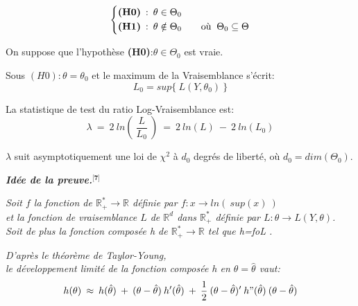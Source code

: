 \documentclass[11pt,fleqn]{book} %
\begin{document}
\vspace{1em}

\begin{equation*}
\left\{\begin{aligned} & \textbf{(H0)} \: : \: \theta\in\Theta_0 \\
 & \textbf{(H1)} \: : \: \theta \notin \Theta_0 
 \qquad \textnormal{où }\: \Theta_0 \subseteq \Theta \end{aligned}\right. 
\end{equation*}

\vspace{2em} 

On suppose que l'hypothèse \textbf{(H0)}\::\:$\theta\in\Theta_0$ est vraie.

\vspace{1em}

Sous $(H0): \theta=\theta_0$ et le maximum de la Vraisemblance s'écrit:
\[
L_0=sup\{\:L(Y,\theta_0)\:\} 
\]

\vspace{2em}

La statistique de test du ratio Log-Vraisemblance est:
\[
\lambda\:=\:2\:ln\left(\:
\frac{L}{L_0}
\:\right) \:=\: 2\:ln(L)\:-\: 2\:ln(L_0)
\]

\vspace{1em}

$\lambda$ suit asymptotiquement une loi de $\chi^2$ à $d_0$ degrés de liberté, où $d_0=dim(\Theta_0)$.

\vspace{0.5em}

\textbf{\textit{Idée de la preuve.$^\textbf{[7]}$}}

\vspace{0.5em}

\textit{
Soit $f$ la fonction de $\mathbb{R}_{+}^{*}\rightarrow\mathbb{R}$ définie par $f:x\rightarrow ln(\:sup(x)\:)$\\ et la fonction de vraisemblance $L$ de $\mathbb{R}^{d}$ dans $\mathbb{R}_{+}^{*}$ définie par $L:\theta \rightarrow L(Y,\theta)$.\\ 
Soit de plus la fonction composée h de $\mathbb{R}_{+}^{*}\rightarrow\mathbb{R}$ tel que h\:=\:f\:o\:L .}

\vspace{1em}

\textit{D'après le théorème de Taylor-Young,\\ 
le développement limité de la fonction composée h en $\theta=\hat{\theta}$ vaut:}\\
\[ 
h(\theta)\:\approx\:h(\hat{\theta})\:+\:(\theta-\hat{\theta})\:h'(\hat{\theta})\:+\: \frac{1}{2} \:(\theta-\hat{\theta})'\:h"(\hat{\theta})\:(\theta-\hat{\theta})
\]
\end{document}

